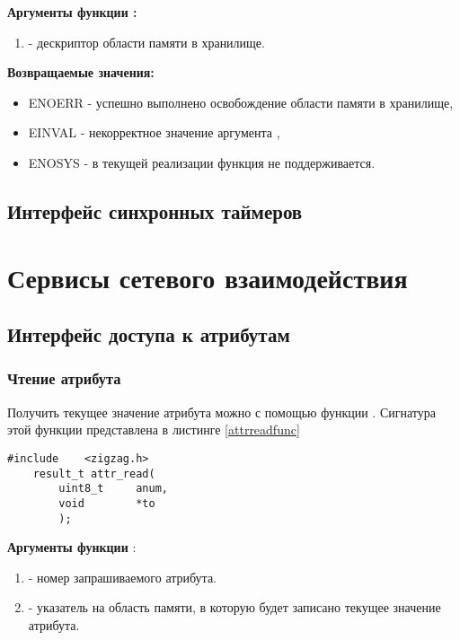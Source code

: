 {\bfseries Аргументы функции :}

{\itshape
\begin{enumerate} 
\item {} - дескриптор области памяти в хранилище.
\end{enumerate}
}

{\bfseries Возвращаемые значения:}

{\itshape
\begin{itemize}
\item ENOERR - успешно выполнено освобождение области памяти в хранилище,
\item EINVAL - некорректное значение аргумента ,
\item ENOSYS - в текущей реализации функция не поддерживается.
\end{itemize}
}

\subsection{Интерфейс синхронных таймеров}

\section{Сервисы сетевого взаимодействия}

\subsection{Интерфейс доступа к атрибутам}

\subsubsection{Чтение атрибута}

Получить текущее значение атрибута можно с помощью функции .
Сигнатура этой функции представлена в листинге \ref{attrreadfunc}

\begin{lstlisting}[caption=Функция \myfunc{attr\_read()} - чтение атрибута. , label=attrreadfunc]
    #include    <zigzag.h>
    result_t attr_read(
        uint8_t     anum,
        void        *to
        );
\end{lstlisting}

{\bfseries Аргументы функции }:

{\itshape
\begin{enumerate}
\item {} - номер запрашиваемого атрибута.
\item {} - указатель на область памяти, в которую будет записано текущее значение атрибута.
\end{enumerate}
}


